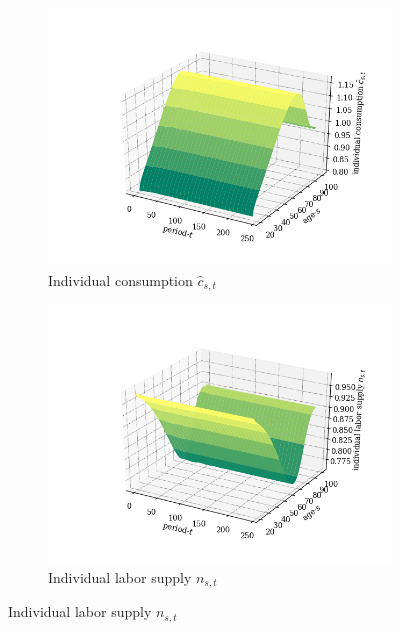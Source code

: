 \documentclass[letterpaper,12pt]{article}
\theoremstyle{definition}
\begin{document}
    \begin{figure}[htbp]\centering \captionsetup{width=5.0in}
    \caption{\label{FigTP_csnsbs}\textbf{Equilibrium transition paths of individual, consumption, labor supply, and savings by age}}
      \begin{subfigure}[b]{0.4\textwidth}
        \includegraphics[width=\textwidth]{images/TP_cs_path.png}
        \caption{Individual consumption $\hat{c}_{s,t}$}
        \label{FigTP_csnsbs_c}
      \end{subfigure}
      \begin{subfigure}[b]{0.4\textwidth}
        \includegraphics[width=\textwidth]{images/TP_ns_path.png}
        \caption{Individual labor supply $n_{s,t}$}
        \label{FigTP_csnsbs_n}

\end{subfigure}
\end{figure}
\end{document}
